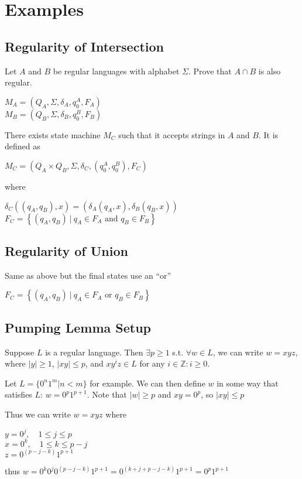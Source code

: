 \section{Examples}
\subsection{Regularity of Intersection}
Let $A$ and $B$ be regular languages with alphabet $\Sigma$. Prove that
$A\cap B$ is also regular.

$M_A = (Q_A, \Sigma, \delta_A, q_0^A, F_A)$ \\
$M_B = (Q_B, \Sigma, \delta_B, q_0^B, F_B)$

There exists state machine $M_C$ such that it accepts strings in $A$ and
$B$. It is defined as

$M_C = (Q_A\times Q_B, \Sigma, \delta_C, (q_0^A, q_0^B), F_C)$

where

$\delta_C((q_A, q_B), x) = (\delta_A(q_A, x), \delta_B(q_B, x))$ \\
$F_C = \left\{(q_A, q_B) ~|~ q_A \in F_A \text{ and } q_B \in F_B\right\}$

\subsection{Regularity of Union}
Same as above but the final states use an ``or''

$F_C = \left\{(q_A, q_B) ~|~ q_A \in F_A \text{ or } q_B \in F_B\right\}$

\subsection{Pumping Lemma Setup}
Suppose $L$ is a regular language. Then $\exists p \geq 1$ s.t. $\forall
w \in L$, we can write $w = xyz$, where $|y| \geq 1$, $|xy| \leq p$, and
$xy^iz \in L$ for any $i\in \mathbb{Z}: i \geq 0$.

Let $L = \{0^n 1^m | n < m\}$ for example. We can then define $w$ in
some way that satisfies $L$: $w = 0^p1^{p+1}$. Note that $|w| \geq p$
and $xy=0^p$, so $|xy| \leq p$

Thus we can write $w = xyz$ where

$y=0^j, \quad 1 \leq j \leq p$\\
$x=0^k, \quad 1 \leq k \leq p - j$\\
$z=0^{(p - j - k)}1^{p+1}$

thus $w = 0^k0^j0^{(p-j-k)}1^{p+1}=0^{(k+j+p-j-k)}1^{p+1}=0^p1^{p+1}$

